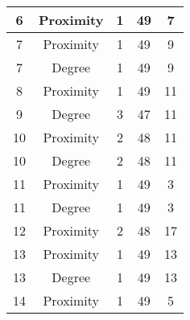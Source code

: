 \documentclass[results.tex]{subfiles}
\begin{document}
\begin{center}
\begin{tabular}{| c || c | c | c | c |}
            \hline
            6                       & Proximity                    & 1                      & 49                      & 7                    \\
            \hline
            7                       & Proximity                    & 1                      & 49                      & 9                    \\
            \hline
            7                       & Degree                       & 1                      & 49                      & 9                    \\
            \hline
            8                       & Proximity                    & 1                      & 49                      & 11                   \\
            \hline
            9                       & Degree                       & 3                      & 47                      & 11                   \\
            \hline
            10                      & Proximity                    & 2                      & 48                      & 11                   \\
            \hline
            10                      & Degree                       & 2                      & 48                      & 11                   \\
            \hline
            11                      & Proximity                    & 1                      & 49                      & 3                    \\
            \hline
            11                      & Degree                       & 1                      & 49                      & 3                    \\
            \hline
            12                      & Proximity                    & 2                      & 48                      & 17                   \\
            \hline
            13                      & Proximity                    & 1                      & 49                      & 13                   \\
            \hline
            13                      & Degree                       & 1                      & 49                      & 13                   \\
            \hline
            14                      & Proximity                    & 1                      & 49                      & 5                    \\

\end{tabular}
\end{center}
\end{document}
